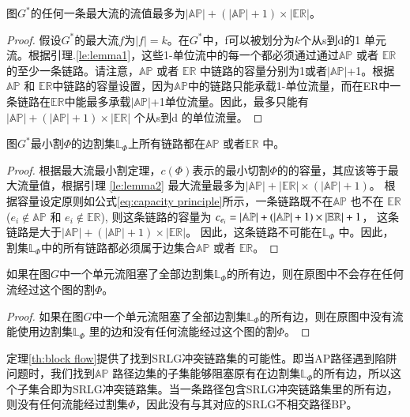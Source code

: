 \begin{lemma}
\label{le:lemma2}
    图$G^*$的任何一条最大流的流值最多为$|\mathbb{AP}|+(|\mathbb{AP}|+1)\times|\mathbb{\mathbb{ER}}|$。
\end{lemma}
\begin{proof}
假设$G^*$的最大流$f$为$|f|=k$。在$G^*$中，f可以被划分为$k$个从s到d的1 单元流。根据引理.\ref{le:lemma1}，这些1-单位流中的每一个都必须通过通过$\mathbb{AP}$ 或者 $\mathbb{\mathbb{ER}}$的至少一条链路。请注意，$\mathbb{AP}$ 或者 $\mathbb{\mathbb{ER}}$ 中链路的容量分别为1或者$|\mathbb{AP}|$+1。根据$\mathbb{AP}$ 和 $\mathbb{\mathbb{ER}}$中链路的容量设置，因为$\mathbb{AP}$中的链路只能承载1-单位流量，而在ER中一条链路在$\mathbb{ER}$中能最多承载$|\mathbb{AP}|$+1单位流量。因此，最多只能有$|\mathbb{AP}|+ (|\mathbb{AP}|+1)\times|\mathbb{\mathbb{ER}}|$ 个从s到d 的单位流量。
\end{proof}

\begin{lemma}
\label{le:lemma3}
    图$G^*$最小割$\Phi$的边割集$\mathbb{L}_{\Phi}$上所有链路都在$\mathbb{AP}$ 或者$\mathbb{\mathbb{ER}}$ 中。
\end{lemma}

\begin{proof}
根据最大流最小割定理，$c(\Phi)$表示的最小切割$\Phi$的的容量，其应该等于最大流量值，根据引理 \ref{le:lemma2} 最大流量最多为$|\mathbb{AP}|+ |\mathbb{ER}|\times (|\mathbb{AP}|+1)$。 根据容量设定原则如公式\ref{eq:capacity principle}所示，一条链路既不在$\mathbb{AP}$ 也不在 $\mathbb{ER}$ ($e_i \notin \mathbb{AP}$ 和 $e_i \notin \mathbb{ER}$), 则这条链路的容量为 $c_{e_i} = \left| {{\rm\mathbb{AP}}} \right| + \left( {\left| {{\rm\mathbb{AP}}} \right| + 1} \right)\times \left| {{\rm{\mathbb{E}}}{{\rm{\mathbb{R}}}}} \right| + 1$， 这条链路是大于$|\mathbb{AP}|+(|\mathbb{AP}|+1)\times |\mathbb{ER}|$。 因此，这条链路不可能在$\mathbb{L}_{\Phi}$ 中。因此，割集$\mathbb{L}_{\Phi}$中的所有链路都必须属于边集合$\mathbb{AP}$ 或者 $\mathbb{ER}$。
\end{proof}


\begin{theorem}
    如果在图$G$中一个单元流阻塞了全部边割集$\mathbb{L}_{\Phi}$的所有边，则在原图中不会存在任何流经过这个图的割$\Phi$。
\label{th:block flow}
\end{theorem}


\begin{proof}
    如果在图$G$中一个单元流阻塞了全部边割集$\mathbb{L}_{\Phi}$的所有边，则在原图中没有流能使用边割集$\mathbb{L}_{\Phi}$ 里的边和没有任何流能经过这个图的割$\Phi$。
\end{proof}
定理\ref{th:block flow}提供了找到SRLG冲突链路集的可能性。即当AP路径遇到陷阱问题时，我们找到$\mathbb{AP}$ 路径边集的子集能够阻塞原有在边割集$\mathbb{L}_{\Phi}$的所有边，所以这个子集合即为SRLG冲突链路集。当一条路径包含SRLG冲突链路集里的所有边，则没有任何流能经过割集$\Phi$，因此没有与其对应的SRLG不相交路径BP。

